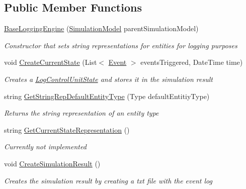 \subsection*{Public Member Functions}
\begin{DoxyCompactItemize}
\item 
\hyperlink{class_sample_hospital_model_1_1_model_log_1_1_base_logging_engine_a73e30dabe28a17c2df5434a524a2ca23}{Base\+Logging\+Engine} (\hyperlink{class_simulation_core_1_1_simulation_classes_1_1_simulation_model}{Simulation\+Model} parent\+Simulation\+Model)
\begin{DoxyCompactList}\small\item\em Constructor that sets string representations for entities for logging purposes \end{DoxyCompactList}\item 
void \hyperlink{class_sample_hospital_model_1_1_model_log_1_1_base_logging_engine_a2c643913b0a3b7f8952a1eb45a272438}{Create\+Current\+State} (List$<$ \hyperlink{class_simulation_core_1_1_h_c_c_m_elements_1_1_event}{Event} $>$ events\+Triggered, Date\+Time time)
\begin{DoxyCompactList}\small\item\em Creates a \hyperlink{class_sample_hospital_model_1_1_model_log_1_1_log_control_unit_state}{Log\+Control\+Unit\+State} and stores it in the simulation result \end{DoxyCompactList}\item 
string \hyperlink{class_sample_hospital_model_1_1_model_log_1_1_base_logging_engine_a5bb2a5dd41c3d56774dde73b7ef34ad3}{Get\+String\+Rep\+Default\+Entity\+Type} (Type default\+Entitiy\+Type)
\begin{DoxyCompactList}\small\item\em Returns the string representation of an entity type \end{DoxyCompactList}\item 
string \hyperlink{class_sample_hospital_model_1_1_model_log_1_1_base_logging_engine_a42d583d084c412154271ebf0cd593696}{Get\+Current\+State\+Representation} ()
\begin{DoxyCompactList}\small\item\em Currently not implemented \end{DoxyCompactList}\item 
void \hyperlink{class_sample_hospital_model_1_1_model_log_1_1_base_logging_engine_adc9e97bf87865ec13637f93b74e28660}{Create\+Simulation\+Result} ()
\begin{DoxyCompactList}\small\item\em Creates the simulation result by creating a txt file with the event log \end{DoxyCompactList}\end{DoxyCompactItemize}
